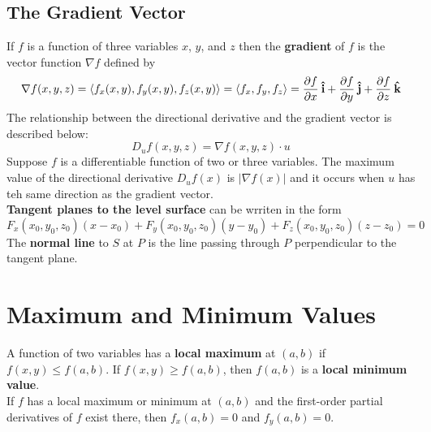 \subsection*{The Gradient Vector}
If $f$ is a function of three variables $x$, $y$, and $z$ then the \textbf{gradient} of $f$ is the vector function $\nabla f$ defined by 
$$\nabla f(x,y,z) = \ev{f_x(x,y), f_y(x,y), f_z(x,y)} = \ev{f_x, f_y, f_z} = \frac{\partial f}{\partial x}\ihat + \frac{\partial f}{\partial y}\jhat + \frac{\partial f}{\partial z}\khat$$
The relationship between the directional derivative and the gradient vector is described below:
$$D_uf(x,y, z) = \nabla f (x,y, z)\cdot u$$
Suppose $f$ is a differentiable function of two or three variables. The maximum value of the directional derivative $D_uf(x)$ is $|\nabla f(x)|$ and it occurs when $u$ has teh same direction as the gradient vector.\\
\textbf{Tangent planes to the level surface} can be wrriten in the form 
$$F_x(x_0, y_0, z_0)(x - x_0) + F_y(x_0, y_0, z_0)(y - y_0) + F_z(x_0, y_0, z_0)(z - z_0) = 0$$
The \textbf{normal line} to $S$ at $P$ is the line passing through $P$ perpendicular to the tangent plane.

\section{Maximum and Minimum Values}
A function of two variables has a \textbf{local maximum} at $(a,b)$ if $f(x,y)\leq f(a,b)$. If $f(x,y)\geq f(a,b)$, then $f(a,b)$ is a \textbf{local minimum value}.\\
If $f$ has a local maximum or minimum at $(a,b)$ and the first-order partial derivatives of $f$ exist there, then $f_x(a,b) = 0$ and $f_y(a,b) = 0$.

